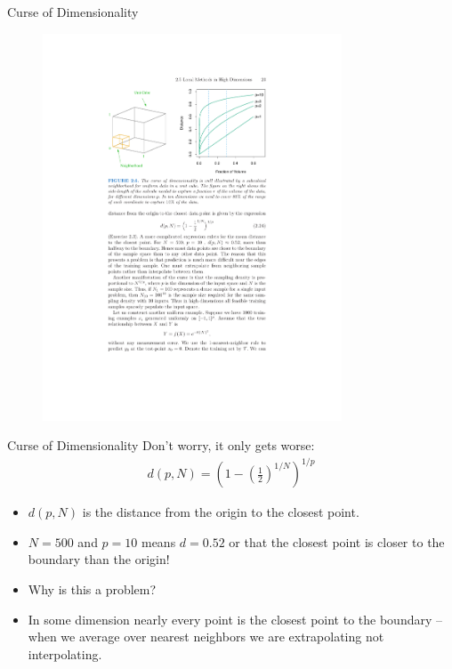 \begin{frame}{Curse of Dimensionality}
\begin{figure}[htbp]
\begin{center}
\includegraphics[width=3.5in]{./resources/figure26.pdf}
\label{class15nn}
\end{center}
\end{figure}
\end{frame}

\begin{frame}{Curse of Dimensionality}
Don't worry, it only gets worse:
\begin{eqnarray*}
d(p,N) = \left(1-\left(\frac{1}{2} \right)^{1/N} \right)^{1/p}
\end{eqnarray*}

\begin{itemize}
\item $d(p,N)$ is the distance from the origin to the closest point.
\item $N=500$ and $p=10$ means $d = 0.52$ or that the closest point is closer to the boundary than the origin!
\item Why is this a problem?
\item In some dimension nearly every point is the closest point to the boundary -- when we average over nearest neighbors we are \alert{extrapolating} not \alert{interpolating}.
\end{itemize}
\end{frame}


